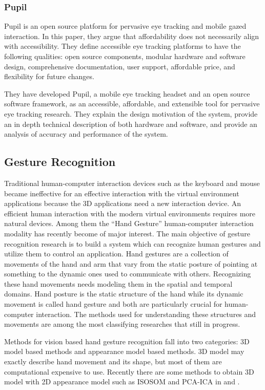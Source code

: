 \subsubsection{Pupil}
Pupil is an open source platform for pervasive eye tracking and mobile gazed interaction. In this paper, they argue that affordability does not necessarily align with accessibility. They define accessible eye tracking platforms to have the following qualities: open source components, modular hardware and software design, comprehensive documentation, user support, affordable price, and flexibility for future changes. \bigskip

They have developed Pupil, a mobile eye tracking headset and an open source software framework, as an accessible, affordable, and extensible tool for pervasive eye tracking research. They explain the design motivation of the system, provide an in depth technical description of both hardware and software, and provide an analysis of accuracy and performance of the system.
\bigskip

\subsection{Gesture Recognition}
Traditional human-computer interaction devices such as the keyboard and mouse became ineffective for an effective interaction with the virtual environment applications because the 3D applications need a new interaction device. An efficient human interaction with the modern virtual environments requires more natural devices. Among them the “Hand Gesture” human-computer interaction modality has recently become of major interest. The main objective of gesture recognition research is to build a system which can recognize human gestures and utilize them to control an application. Hand gestures are a collection of movements of the hand and arm that vary from the static posture of pointing at something to the dynamic ones used to communicate with others. Recognizing these hand movements needs modeling them in the
spatial and temporal domains. Hand posture is the static structure of the hand while its dynamic movement is called hand gesture and both are particularly crucial for human-computer interaction. The methods used for understanding these structures and movements are among the most classifying researches that still in progress.
\bigskip

Methods for vision based hand gesture recognition fall into two categories: 3D model based methods and appearance model based methods. 3D model may exactly describe hand movement and its shape, but most of them are computational expensive to use. Recently there are some methods to obtain 3D model with 2D appearance model such as ISOSOM and PCA-ICA in \cite{relatedsg1} and \cite{relatedsg2}.
\bigskip

